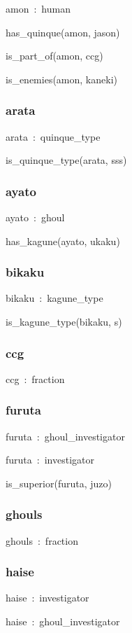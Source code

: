 \documentclass{article}
\begin{document}
amon~:~human

has\_quinque(amon, jason)

is\_part\_of(amon, ccg)

is\_enemies(amon, kaneki)

\subsubsection*{arata}

arata~:~quinque\_type

is\_quinque\_type(arata, sss)

\subsubsection*{ayato}

ayato~:~ghoul

has\_kagune(ayato, ukaku)

\subsubsection*{bikaku}

bikaku~:~kagune\_type

is\_kagune\_type(bikaku, s)

\subsubsection*{ccg}

ccg~:~fraction

\subsubsection*{furuta}

furuta~:~ghoul\_investigator

furuta~:~investigator

is\_superior(furuta, juzo)

\subsubsection*{ghouls}

ghouls~:~fraction

\subsubsection*{haise}

haise~:~investigator

haise~:~ghoul\_investigator
\end{document}
